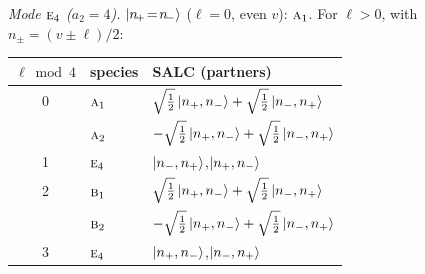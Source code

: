 \documentclass[11pt]{article}
\newcommand{\irr}[1]{\text{\normalfont\scshape #1}}
\begin{document}
\emph{Mode $\irr{e}_{4}$ ($a_2=4$).} $\ket{n_{\!+}\!=\!n_{\!-}}$ ($\ell=0$, even $v$): $\irr{a}_{1}$. For $\ell>0$, with $n_\pm=(v\pm\ell)/2$:
\begin{longtable}{c l l}\hline $\ell\bmod 4$ & species & SALC (partners)\\ \hline\endhead
0 & $\irr{a}_{1}$ & $\sqrt{\tfrac{1}{2}}\ket{n_+,n_-}+\sqrt{\tfrac{1}{2}}\ket{n_-,n_+}$\\
 & $\irr{a}_{2}$ & $-\sqrt{\tfrac{1}{2}}\ket{n_+,n_-}+\sqrt{\tfrac{1}{2}}\ket{n_-,n_+}$\\
1 & $\irr{e}_{4}$ & $\ket{n_-,n_+}$,\quad $\ket{n_+,n_-}$\\
2 & $\irr{b}_{1}$ & $\sqrt{\tfrac{1}{2}}\ket{n_+,n_-}+\sqrt{\tfrac{1}{2}}\ket{n_-,n_+}$\\
 & $\irr{b}_{2}$ & $-\sqrt{\tfrac{1}{2}}\ket{n_+,n_-}+\sqrt{\tfrac{1}{2}}\ket{n_-,n_+}$\\
3 & $\irr{e}_{4}$ & $\ket{n_+,n_-}$,\quad $\ket{n_-,n_+}$\\
\hline\end{longtable}
\end{document}
